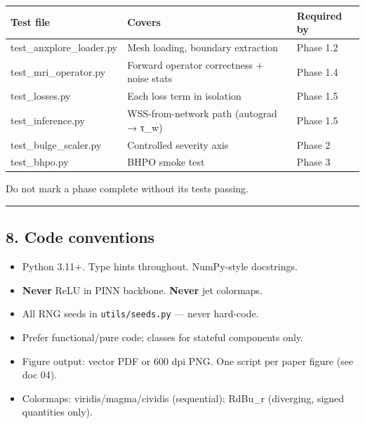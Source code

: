 \documentclass[
]{article}
\providecommand{\tightlist}{%
  \setlength{\itemsep}{0pt}\setlength{\parskip}{0pt}}
\begin{document}
\begin{longtable}[]{@{}
  >{\raggedright\arraybackslash}p{}
  >{\raggedright\arraybackslash}p{}
  >{\raggedright\arraybackslash}p{}@{}}
\toprule\noalign{}
\begin{minipage}[b]{\linewidth}\raggedright
Test file
\end{minipage} & \begin{minipage}[b]{\linewidth}\raggedright
Covers
\end{minipage} & \begin{minipage}[b]{\linewidth}\raggedright
Required by
\end{minipage} \\
\midrule\noalign{}
\endhead
\bottomrule\noalign{}
\endlastfoot
test\_anxplore\_loader.py & Mesh loading, boundary extraction & Phase
1.2 \\
test\_mri\_operator.py & Forward operator correctness + noise stats &
Phase 1.4 \\
test\_losses.py & Each loss term in isolation & Phase 1.5 \\
test\_inference.py & WSS-from-network path (autograd → τ\_w) & Phase
1.5 \\
test\_bulge\_scaler.py & Controlled severity axis & Phase 2 \\
test\_bhpo.py & BHPO smoke test & Phase 3 \\
\end{longtable}

Do not mark a phase complete without its tests passing.

\begin{center}\rule{0.5\linewidth}{0.5pt}\end{center}

\subsection{8. Code conventions}\label{code-conventions}

\begin{itemize}
\tightlist
\item
  Python 3.11+. Type hints throughout. NumPy-style docstrings.
\item
  \textbf{Never} ReLU in PINN backbone. \textbf{Never} jet colormaps.
\item
  All RNG seeds in \texttt{utils/seeds.py} --- never hard-code.
\item
  Prefer functional/pure code; classes for stateful components only.
\item
  Figure output: vector PDF or 600 dpi PNG. One script per paper figure
  (see doc 04).
\item
  Colormaps: viridis/magma/cividis (sequential); RdBu\_r (diverging,
  signed quantities only).
\end{itemize}
\end{document}
